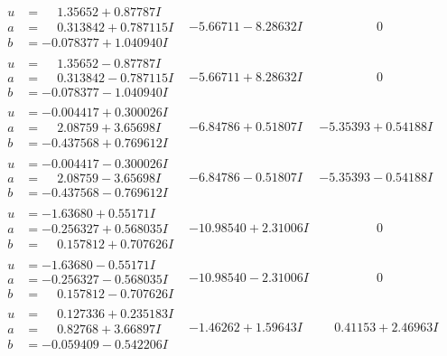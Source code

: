 \documentclass[1p]{elsarticle_modified}
\theoremstyle{definition}
\begin{document}
$$\begin{array}{c|c|c}
\begin{aligned}
u &= \phantom{-}1.35652 + 0.87787 I \\
a &= \phantom{-}0.313842 + 0.787115 I \\
b &= -0.078377 + 1.040940 I\end{aligned}
 & -5.66711 - 8.28632 I & \phantom{-0.000000 } 0 \\ \hline\begin{aligned}
u &= \phantom{-}1.35652 - 0.87787 I \\
a &= \phantom{-}0.313842 - 0.787115 I \\
b &= -0.078377 - 1.040940 I\end{aligned}
 & -5.66711 + 8.28632 I & \phantom{-0.000000 } 0 \\ \hline\begin{aligned}
u &= -0.004417 + 0.300026 I \\
a &= \phantom{-}2.08759 + 3.65698 I \\
b &= -0.437568 + 0.769612 I\end{aligned}
 & -6.84786 + 0.51807 I & -5.35393 + 0.54188 I \\ \hline\begin{aligned}
u &= -0.004417 - 0.300026 I \\
a &= \phantom{-}2.08759 - 3.65698 I \\
b &= -0.437568 - 0.769612 I\end{aligned}
 & -6.84786 - 0.51807 I & -5.35393 - 0.54188 I \\ \hline\begin{aligned}
u &= -1.63680 + 0.55171 I \\
a &= -0.256327 + 0.568035 I \\
b &= \phantom{-}0.157812 + 0.707626 I\end{aligned}
 & -10.98540 + 2.31006 I & \phantom{-0.000000 } 0 \\ \hline\begin{aligned}
u &= -1.63680 - 0.55171 I \\
a &= -0.256327 - 0.568035 I \\
b &= \phantom{-}0.157812 - 0.707626 I\end{aligned}
 & -10.98540 - 2.31006 I & \phantom{-0.000000 } 0 \\ \hline\begin{aligned}
u &= \phantom{-}0.127336 + 0.235183 I \\
a &= \phantom{-}0.82768 + 3.66897 I \\
b &= -0.059409 - 0.542206 I\end{aligned}
 & -1.46262 + 1.59643 I & \phantom{-}0.41153 + 2.46963 I \\ \hline\begin{aligned}

\end{aligned}
\end{array}$$
\end{document}
